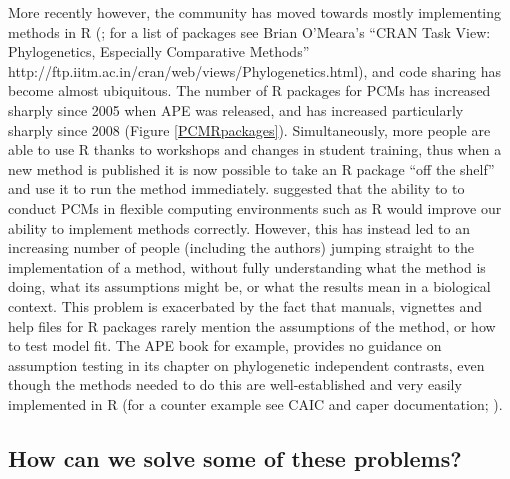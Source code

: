 \documentclass[a4paper,12pt]{article}
\begin{document}
    More recently however, the community has moved towards mostly implementing methods in R (\citealp{R-Core-Team:2014aa}; for a list of packages see Brian O'Meara's ``CRAN Task View: Phylogenetics, Especially Comparative Methods'' http://ftp.iitm.ac.in/cran/web/views/Phylogenetics.html), and code sharing has become almost ubiquitous. 
    The number of R packages for PCMs has increased sharply since 2005 when APE \citep{Paradis:2004aa} was released, and has increased particularly sharply since 2008 (Figure \ref{PCMRpackages}).
    Simultaneously, more people are able to use R thanks to workshops and changes in student training, thus when a new method is published it is now possible to take an R package ``off the shelf'' and use it to run the method immediately.
    \citet{freckleton2009seven} suggested that the ability to to conduct PCMs in flexible computing environments such as R would improve our ability to implement methods correctly. 
    However, this has instead led to an increasing number of people (including the authors) jumping straight to the implementation of a method, without fully understanding what the method is doing, what its assumptions might be, or what the results mean in a biological context.
    This problem is exacerbated by the fact that manuals, vignettes and help files for R packages rarely mention the assumptions of the method, or how to test model fit. 
    The APE book \citep{paradis2011analysis} for example, provides no guidance on assumption testing in its chapter on phylogenetic independent contrasts, even though the methods needed to do this are well-established and very easily implemented in R (for a counter example see CAIC and caper documentation; \citealp{purvis1995comparative,Orme:2013aa}).

\subsection{How can we solve some of these problems?}
\end{document}

